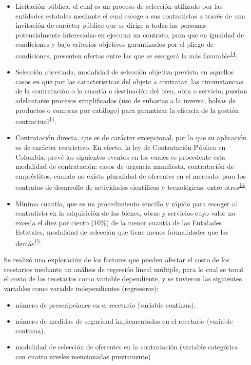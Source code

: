 \documentclass[
  oneside]{book}
\begin{document}
\begin{itemize}
\item
  Licitación pública, el cual es un proceso de selección utilizado por las entidades estatales mediante el cual escoge a sus contratistas a través de una invitación de carácter público que se dirige a todas las personas potencialmente interesadas en ejecutar un contrato, para que en igualdad de condiciones y bajo criterios objetivos garantizados por el pliego de condiciones, presenten ofertas entre las que se escogerá la más favorable\textsuperscript{\protect\hyperlink{ref-MinisteriodeRelacionesExteriores2014}{14}}.
\item
  Selección abreviada, modalidad de selección objetiva prevista en aquellos casos en que por las características del objeto a contratar, las circunstancias de la contratación o la cuantía o destinación del bien, obra o servicio, puedan adelantarse procesos simplificados (uso de subastas a la inversa, bolsas de productos o compras por catálogo) para garantizar la eficacia de la gestión contractual\textsuperscript{\protect\hyperlink{ref-MinisteriodeRelacionesExteriores2014}{14}}.
\item
  Contratación directa, que es de carácter excepcional, por lo que su aplicación es de carácter restrictivo. En efecto, la ley de Contratación Pública en Colombia, prevé los siguientes eventos en los cuales es procedente esta modalidad de contratación: casos de urgencia manifiesta, contratación de empréstitos, cuando no exista pluralidad de oferentes en el mercado, para los contratos de desarrollo de actividades científicas y tecnológicas, entre otros\textsuperscript{\protect\hyperlink{ref-MinisteriodeRelacionesExteriores2014}{14}}.
\item
  Mínima cuantía, que es un procedimiento sencillo y rápido para escoger al contratista en la adquisición de los bienes, obras y servicios cuyo valor no exceda el diez por ciento (10\%) de la menor cuantía de las Entidades Estatales, modalidad de selección que tiene menos formalidades que las demás\textsuperscript{\protect\hyperlink{ref-ColombiaCompraEficiente2019}{15}}.
\end{itemize}

Se realizó una exploración de los factores que pueden afectar el costo de los recetarios mediante un análisis de regresión lineal múltiple, para lo cual se tomó el costo de los recetarios como variable dependiente, y se tuvieron las siguientes variables como variable independientes (regresores):

\begin{itemize}
\item
  número de prescripciones en el recetario (variable continua).
\item
  número de medidas de seguridad implementadas en el recetario (variable continua).
\item
  modalidad de selección de oferentes en la contratación (variable categórica con cuatro niveles mencionadas previamente)
\end{itemize}
\end{document}
